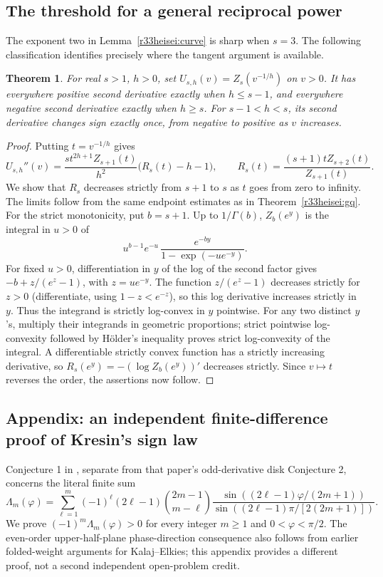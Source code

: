 \documentclass[11pt,a4paper]{article}
\numberwithin{equation}{section}
\newtheorem{theorem}{Theorem}[section]
\theoremstyle{definition}
\theoremstyle{remark}
\begin{document}
\subsection{The threshold for a general reciprocal power}
The exponent two in Lemma~\ref{r33heisei:curve} is sharp when $s=3$. The following classification identifies precisely where the tangent argument is available.
\begin{theorem}\label{r33heisei:threshold}
For real $s>1$, $h>0$, set $U_{s,h}(v)=Z_s(v^{-1/h})$ on $v>0$. It has everywhere positive second derivative exactly when $h\le s-1$, and everywhere negative second derivative exactly when $h\ge s$. For $s-1<h<s$, its second derivative changes sign exactly once, from negative to positive as $v$ increases.
\end{theorem}
\begin{proof}
Putting $t=v^{-1/h}$ gives
\[
 U_{s,h}''(v)=\frac{s t^{2h+1}Z_{s+1}(t)}{h^2}\big(R_s(t)-h-1\big),
 \qquad R_s(t)=\frac{(s+1)t Z_{s+2}(t)}{Z_{s+1}(t)}.
\]
We show that $R_s$ decreases strictly from $s+1$ to $s$ as $t$ goes from zero to infinity. The limits follow from the same endpoint estimates as in Theorem~\ref{r33heisei:gq}. For the strict monotonicity, put $b=s+1$. Up to $1/\Gamma(b)$, $Z_b(e^y)$ is the integral in $u>0$ of
\[
 u^{b-1}e^{-u}\,\frac{e^{-by}}{1-\exp(-ue^{-y})}.
\]
For fixed $u>0$, differentiation in $y$ of the log of the second factor gives $-b+z/(e^z-1)$, with $z=ue^{-y}$. The function $z/(e^z-1)$ decreases strictly for $z>0$ (differentiate, using $1-z<e^{-z}$), so this log derivative increases strictly in $y$. Thus the integrand is strictly log-convex in $y$ pointwise. For any two distinct $y$'s, multiply their integrands in geometric proportions; strict pointwise log-convexity followed by H\"older's inequality proves strict log-convexity of the integral. A differentiable strictly convex function has a strictly increasing derivative, so $R_s(e^y)=-(\log Z_b(e^y))'$ decreases strictly. Since $v\mapsto t$ reverses the order, the assertions now follow.
\end{proof}

\subsection*{Appendix: an independent finite-difference proof of Kresin's sign law}
Conjecture 1 in \cite{r33heisei:Kr}, separate from that paper's odd-derivative disk Conjecture 2, concerns the literal finite sum
\[
 \Lambda_m(\varphi)=\sum_{\ell=1}^m(-1)^\ell(2\ell-1)
 \binom{2m-1}{m-\ell}
 \frac{\sin((2\ell-1)\varphi/(2m+1))}
 {\sin((2\ell-1)\pi/[2(2m+1)])}.
\]
We prove $(-1)^m\Lambda_m(\varphi)>0$ for every integer $m\ge1$ and $0<\varphi<\pi/2$. The even-order upper-half-plane phase-direction consequence also follows from earlier folded-weight arguments for Kalaj--Elkies; this appendix provides a different proof, not a second independent open-problem credit.
\end{document}
